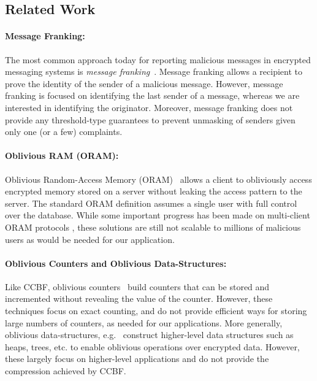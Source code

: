 \subsection{Related Work}\label{sec:related}
\paragraph{Message Franking:}
The most common approach today for reporting malicious messages in encrypted messaging systems is \emph{message franking}~\cite{C:DGRW18, C:TGLMR19, C:GruLuRis17}.  Message franking allows a recipient to prove the identity of the sender of a malicious message.  However, message franking is focused on identifying the last sender of a message, whereas we are interested in identifying the originator.  Moreover, message franking does not provide any threshold-type guarantees to prevent unmasking of senders given only one (or a few) complaints.

\paragraph{Oblivious RAM (ORAM):}
Oblivious Random-Access Memory (ORAM)~\cite{STOC:Goldreich87, STOC:Ostrovsky90, JACM:GolOst96} allows a client to obliviously access encrypted memory stored on a server without leaking the access pattern to the server.
The standard ORAM definition assumes a single user with full control over the database.
While some important progress has been made on multi-client ORAM protocols
\cite{maffei-msmcoram,concuroram,MOSE},
these solutions are still not scalable to millions of malicious users as would be needed
for our application.

\paragraph{Oblivious Counters and Oblivious Data-Structures:}
Like CCBF, oblivious counters~\cite{EC:KatMyeOst01, FC:GohGol05} build counters that can be stored and incremented without revealing the value of the counter.  However, these techniques focus on exact counting, and do not provide efficient ways for storing large numbers of counters, as needed for our applications.  More generally, oblivious data-structures, e.g.~\cite{CCS:WNLCSS14, AC:KelSch14, SP:Shi20} 
construct higher-level data structures such as heaps, trees, etc. to enable oblivious operations over encrypted data.  However, these largely focus on higher-level applications and do not provide the compression achieved by CCBF.



